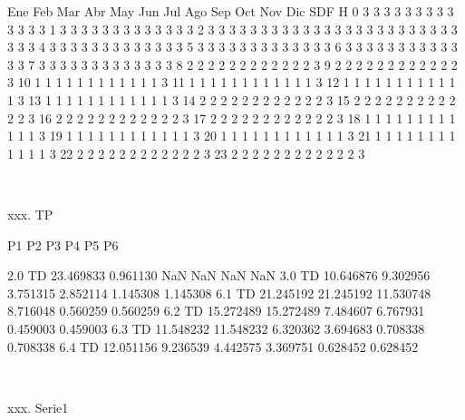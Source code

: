 \documentclass[a4paper,10pt]{article}
\begin{document}
\begin{Form}
    Ene  Feb  Mar  Abr  May  Jun  Jul  Ago  Sep  Oct  Nov  Dic  SDF
H                                                                  
0     3    3    3    3    3    3    3    3    3    3    3    3    3
1     3    3    3    3    3    3    3    3    3    3    3    3    3
2     3    3    3    3    3    3    3    3    3    3    3    3    3
3     3    3    3    3    3    3    3    3    3    3    3    3    3
4     3    3    3    3    3    3    3    3    3    3    3    3    3
5     3    3    3    3    3    3    3    3    3    3    3    3    3
6     3    3    3    3    3    3    3    3    3    3    3    3    3
7     3    3    3    3    3    3    3    3    3    3    3    3    3
8     2    2    2    2    2    2    2    2    2    2    2    2    3
9     2    2    2    2    2    2    2    2    2    2    2    2    3
10    1    1    1    1    1    1    1    1    1    1    1    1    3
11    1    1    1    1    1    1    1    1    1    1    1    1    3
12    1    1    1    1    1    1    1    1    1    1    1    1    3
13    1    1    1    1    1    1    1    1    1    1    1    1    3
14    2    2    2    2    2    2    2    2    2    2    2    2    3
15    2    2    2    2    2    2    2    2    2    2    2    2    3
16    2    2    2    2    2    2    2    2    2    2    2    2    3
17    2    2    2    2    2    2    2    2    2    2    2    2    3
18    1    1    1    1    1    1    1    1    1    1    1    1    3
19    1    1    1    1    1    1    1    1    1    1    1    1    3
20    1    1    1    1    1    1    1    1    1    1    1    1    3
21    1    1    1    1    1    1    1    1    1    1    1    1    3
22    2    2    2    2    2    2    2    2    2    2    2    2    3
23    2    2    2    2    2    2    2    2    2    2    2    2    3

\

xxx. TP

               P1         P2         P3        P4        P5        P6
                                                                     
2.0 TD  23.469833   0.961130        NaN       NaN       NaN       NaN
3.0 TD  10.646876   9.302956   3.751315  2.852114  1.145308  1.145308
6.1 TD  21.245192  21.245192  11.530748  8.716048  0.560259  0.560259
6.2 TD  15.272489  15.272489   7.484607  6.767931  0.459003  0.459003
6.3 TD  11.548232  11.548232   6.320362  3.694683  0.708338  0.708338
6.4 TD  12.051156   9.236539   4.442575  3.369751  0.628452  0.628452

\

xxx. Serie1


\end{Form}
\end{document}
